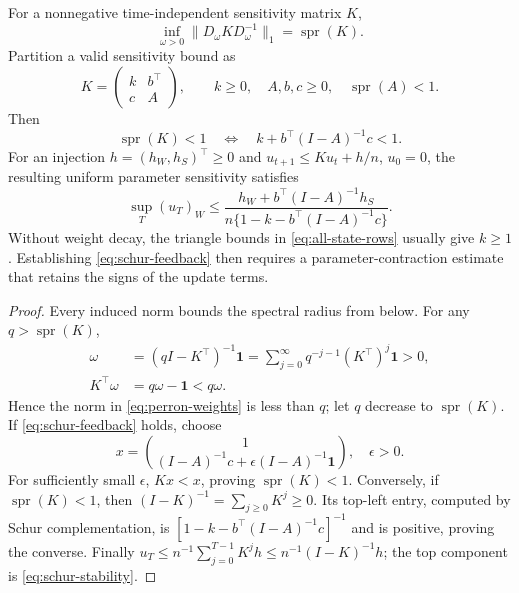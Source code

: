 \begin{proposition}
\label{prop:spectral-feedback}
For a nonnegative time-independent sensitivity matrix $K$,
\begin{equation}
 \inf_{\omega>0}\|D_\omega KD_\omega^{-1}\|_1
 =\operatorname{spr}(K).\label{eq:perron-weights}
\end{equation}
Partition a valid sensitivity bound as
\begin{equation}
 K=\begin{pmatrix}k&b^\top\\c&A\end{pmatrix},\qquad
 k\ge0,\quad A,b,c\ge0,\quad\operatorname{spr}(A)<1.
\end{equation}
Then
\begin{equation}
 \operatorname{spr}(K)<1
 \quad\Longleftrightarrow\quad
 k+b^\top(I-A)^{-1}c<1.\label{eq:schur-feedback}
\end{equation}
For an injection $h=(h_W,h_S)^\top\ge0$ and
$u_{t+1}\le Ku_t+h/n$, $u_0=0$, the resulting uniform parameter sensitivity
satisfies
\begin{equation}
 \sup_T(u_T)_W
 \le\frac{h_W+b^\top(I-A)^{-1}h_S}
 {n\{1-k-b^\top(I-A)^{-1}c\}}.\label{eq:schur-stability}
\end{equation}
Without weight decay, the triangle bounds in \eqref{eq:all-state-rows}
usually give $k\ge1$. Establishing \eqref{eq:schur-feedback} then requires
a parameter-contraction estimate that retains the signs of the update terms.
\end{proposition}
\begin{proof}
Every induced norm bounds the spectral radius from below. For any
$q>\operatorname{spr}(K)$,
\begin{align}
 \omega&=(qI-K^\top)^{-1}\mathbf1
       =\sum_{j=0}^{\infty}q^{-j-1}(K^\top)^j\mathbf1>0,\\
 K^\top\omega&=q\omega-\mathbf1<q\omega.
\end{align}
Hence the norm in \eqref{eq:perron-weights} is less than $q$;
let $q$ decrease to $\operatorname{spr}(K)$.
If \eqref{eq:schur-feedback} holds, choose
\begin{equation}
 x=\binom{1}{(I-A)^{-1}c+\epsilon(I-A)^{-1}\mathbf1},\quad\epsilon>0.
\end{equation}
For sufficiently small $\epsilon$, $Kx<x$, proving
$\operatorname{spr}(K)<1$. Conversely, if $\operatorname{spr}(K)<1$,
then $(I-K)^{-1}=\sum_{j\ge0}K^j\ge0$. Its top-left entry, computed by
Schur complementation, is
$[1-k-b^\top(I-A)^{-1}c]^{-1}$ and is positive, proving the converse.
Finally $u_T\le n^{-1}\sum_{j=0}^{T-1}K^jh\le n^{-1}(I-K)^{-1}h$;
the top component is \eqref{eq:schur-stability}.
\end{proof}

